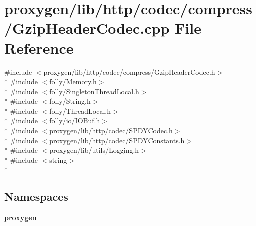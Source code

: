 \section{proxygen/lib/http/codec/compress/\+Gzip\+Header\+Codec.cpp File Reference}
\label{GzipHeaderCodec_8cpp}
{\ttfamily \#include $<$proxygen/lib/http/codec/compress/\+Gzip\+Header\+Codec.\+h$>$}\\*
{\ttfamily \#include $<$folly/\+Memory.\+h$>$}\\*
{\ttfamily \#include $<$folly/\+Singleton\+Thread\+Local.\+h$>$}\\*
{\ttfamily \#include $<$folly/\+String.\+h$>$}\\*
{\ttfamily \#include $<$folly/\+Thread\+Local.\+h$>$}\\*
{\ttfamily \#include $<$folly/io/\+I\+O\+Buf.\+h$>$}\\*
{\ttfamily \#include $<$proxygen/lib/http/codec/\+S\+P\+D\+Y\+Codec.\+h$>$}\\*
{\ttfamily \#include $<$proxygen/lib/http/codec/\+S\+P\+D\+Y\+Constants.\+h$>$}\\*
{\ttfamily \#include $<$proxygen/lib/utils/\+Logging.\+h$>$}\\*
{\ttfamily \#include $<$string$>$}\\*
\subsection*{Namespaces}
\begin{DoxyCompactItemize}
\item 
 {\bf proxygen}
\end{DoxyCompactItemize}
